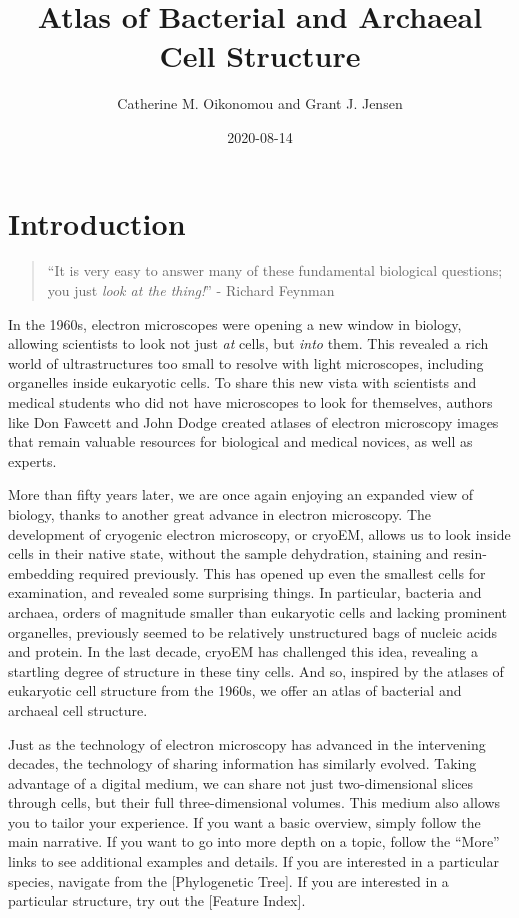 \documentclass[]{tufte-book}
\title{Atlas of Bacterial and Archaeal Cell Structure}
\author{Catherine M. Oikonomou and Grant J. Jensen}
\date{2020-08-14}
\begin{document}
\maketitle



{
\setcounter{tocdepth}{1}
\tableofcontents
}

\chapter*{Introduction}\label{introduction}

\begin{quote}
``It is very easy to answer many of these fundamental biological
questions; you just \emph{look at the thing!}'' - Richard Feynman
\citep{feynman1960}
\end{quote}

In the 1960s, electron microscopes were opening a new window in biology,
allowing scientists to look not just \emph{at} cells, but \emph{into}
them. This revealed a rich world of ultrastructures too small to resolve
with light microscopes, including organelles inside eukaryotic cells. To
share this new vista with scientists and medical students who did not
have microscopes to look for themselves, authors like Don Fawcett
\citep{fawcett1966} and John Dodge \citep{dodge1968} created atlases of
electron microscopy images that remain valuable resources for biological
and medical novices, as well as experts.

More than fifty years later, we are once again enjoying an expanded view
of biology, thanks to another great advance in electron microscopy. The
development of cryogenic electron microscopy, or cryoEM, allows us to
look inside cells in their native state, without the sample dehydration,
staining and resin-embedding required previously. This has opened up
even the smallest cells for examination, and revealed some surprising
things. In particular, bacteria and archaea, orders of magnitude smaller
than eukaryotic cells and lacking prominent organelles, previously
seemed to be relatively unstructured bags of nucleic acids and protein.
In the last decade, cryoEM has challenged this idea, revealing a
startling degree of structure in these tiny cells. And so, inspired by
the atlases of eukaryotic cell structure from the 1960s, we offer an
atlas of bacterial and archaeal cell structure.

Just as the technology of electron microscopy has advanced in the
intervening decades, the technology of sharing information has similarly
evolved. Taking advantage of a digital medium, we can share not just
two-dimensional slices through cells, but their full three-dimensional
volumes. This medium also allows you to tailor your experience. If you
want a basic overview, simply follow the main narrative. If you want to
go into more depth on a topic, follow the ``More'' links to see
additional examples and details. If you are interested in a particular
species, navigate from the {[}Phylogenetic Tree{]}. If you are
interested in a particular structure, try out the {[}Feature Index{]}.
\end{document}
